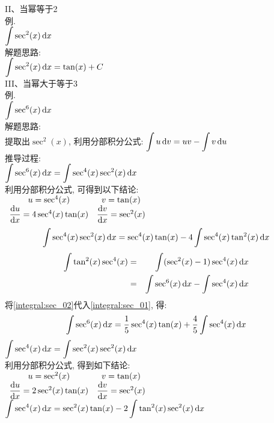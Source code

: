 II、当幂等于2\\
例.\\
$\displaystyle\int\sec^2(x)\mathop{}\!\mathrm{d} x$\\
解题思路:\\
$\displaystyle\int\sec^2(x)\mathop{}\!\mathrm{d} x=\tan(x)+C$\\[2ex]

III、当幂大于等于3\\
例.\\
$\displaystyle\int\sec^6(x)\mathop{}\!\mathrm{d} x$\\
解题思路:\\
提取出$\sec^2(x)$, 利用分部积分公式: $\displaystyle\int u\mathop{}\!\mathrm{d} v=uv-\int v\mathop{}\!\mathrm{d} u$\\
推导过程:\\
$\displaystyle\int\sec^6(x)\mathop{}\!\mathrm{d} x=\int\sec^4(x)\sec^2(x)\mathop{}\!\mathrm{d} x$\\
利用分部积分公式, 可得到以下结论:\\
$\begin{array}{c c}
u=\sec^4(x) & v=\tan(x)\\
\dfrac{\mathop{}\!\mathrm{d} u}{\mathop{}\!\mathrm{d} x}=4\sec^4(x)\tan(x) & \dfrac{\mathop{}\!\mathrm{d} v}{\mathop{}\!\mathrm{d} x}=\sec^2(x)
\end{array}$\\[1ex]
\begin{equation}
\int\sec^4(x)\sec^2(x)\mathop{}\!\mathrm{d} x=\sec^4(x)\tan(x)-4\int\sec^4(x)\tan^2(x)\mathop{}\!\mathrm{d} x\label{integral:sec_01}
\end{equation}
\begin{eqnarray}
\int\tan^2(x)\sec^4(x) & = & \int(\sec^2(x)-1)\sec^4(x)\mathop{}\!\mathrm{d} x\nonumber\\
& = & \int\sec^6(x)\mathop{}\!\mathrm{d} x-\int\sec^4(x)\mathop{}\!\mathrm{d} x\label{integral:sec_02}
\end{eqnarray}
将\eqref{integral:sec_02}代入\eqref{integral:sec_01}, 得:\\
\begin{equation}
\displaystyle\int\sec^6(x)\mathop{}\!\mathrm{d} x=\frac{1}{5}\sec^4(x)\tan(x)+\frac{4}{5}\int\sec^4(x)\mathop{}\!\mathrm{d} x\label{integral:sec_03}
\end{equation}
$\displaystyle\int\sec^4(x)\mathop{}\!\mathrm{d} x=\int\sec^2(x)\sec^2(x)\mathop{}\!\mathrm{d} x$\\
利用分部积分公式, 得到如下结论:\\
$\begin{array}{c c}
u=\sec^2(x) & v=\tan(x)\\
\dfrac{\mathop{}\!\mathrm{d} u}{\mathop{}\!\mathrm{d} x}=2\sec^2(x)\tan(x) & \dfrac{\mathop{}\!\mathrm{d} v}{\mathop{}\!\mathrm{d} x}=\sec^2(x)
\end{array}$\\[1ex]
$\displaystyle\int\sec^4(x)\mathop{}\!\mathrm{d} x=\sec^2(x)\tan(x)-2\int\tan^2(x)\sec^2(x)\mathop{}\!\mathrm{d} x$\\
